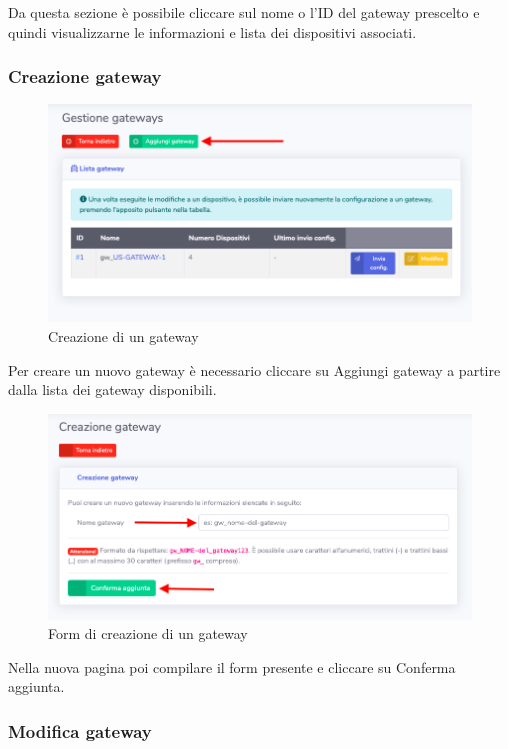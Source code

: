 		Da questa sezione è possibile cliccare sul nome o l'ID del gateway prescelto e quindi visualizzarne le informazioni e lista dei dispositivi associati.

	\subsubsection{Creazione gateway}

		\begin{figure}[H]
		\centering
		\includegraphics[scale=0.500]{res/images/admin/selCreazGateway.png}
		\caption{Creazione di un gateway}
	\end{figure}


		Per creare un nuovo gateway è necessario cliccare su Aggiungi gateway a partire dalla lista dei gateway disponibili.

		\begin{figure}[H]
		\centering
		\includegraphics[scale=0.500]{res/images/admin/creazGateway.png}
		\caption{Form di creazione di un gateway}
	\end{figure}


		Nella nuova pagina poi compilare il form presente e cliccare su Conferma aggiunta. 

	\subsubsection{Modifica gateway}

